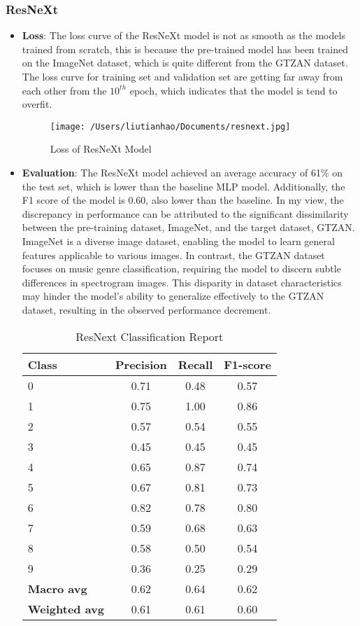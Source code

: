 \documentclass{article}
\begin{document}
\subsubsection{ResNeXt}
\begin{itemize}
  \item \textbf{Loss}: The loss curve of the ResNeXt model is not as smooth as the models trained from scratch, this is because the pre-trained model has been trained on the ImageNet dataset, which is quite different from the GTZAN dataset.
  The loss curve for training set and validation set are getting far away from each other from the $10^{th}$ epoch, which indicates that the model is tend to overfit.
  
  \begin{figure}[h]
    \centering
    \texttt{[image: /Users/liutianhao/Documents/resnext.jpg]}
    \caption{Loss of ResNeXt Model}
  \end{figure}

  \item \textbf{Evaluation}: The ResNeXt model achieved an average accuracy of 61\% on the test set, which is lower than the baseline MLP model.
  Additionally, the F1 score of the model is 0.60, also lower than the baseline. In my view, the discrepancy in performance can be attributed to the significant dissimilarity between the pre-training dataset, ImageNet, and the target dataset, GTZAN. 
  ImageNet is a diverse image dataset, enabling the model to learn general features applicable to various images. In contrast, the GTZAN dataset focuses on music genre classification, requiring the model to discern subtle differences in spectrogram images. 
  This disparity in dataset characteristics may hinder the model's ability to generalize effectively to the GTZAN dataset, resulting in the observed performance decrement.

  
  \begin{table}[h]
    \centering
    \caption{ResNext Classification Report}
    \begin{tabular}{lccc}
      \toprule
      \textbf{Class} & \textbf{Precision} & \textbf{Recall} & \textbf{F1-score} \\
      \midrule
      0 & 0.71 & 0.48 & 0.57 \\
      1 & 0.75 & 1.00 & 0.86 \\
      2 & 0.57 & 0.54 & 0.55 \\
      3 & 0.45 & 0.45 & 0.45 \\
      4 & 0.65 & 0.87 & 0.74 \\
      5 & 0.67 & 0.81 & 0.73 \\
      6 & 0.82 & 0.78 & 0.80 \\
      7 & 0.59 & 0.68 & 0.63 \\
      8 & 0.58 & 0.50 & 0.54 \\
      9 & 0.36 & 0.25 & 0.29 \\
      \midrule
      \textbf{Macro avg} & 0.62 & 0.64 & 0.62 \\
      \textbf{Weighted avg} & 0.61 & 0.61 & 0.60 \\
      \bottomrule
    \end{tabular}
  \end{table}
\end{itemize}
\end{document}

